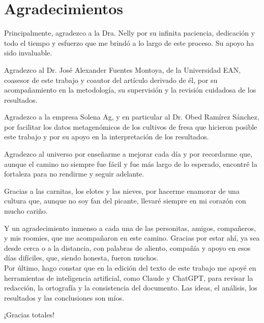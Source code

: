\documentclass[11pt]{book}
\begin{document}

\chapter*{Agradecimientos}

Principalmente, agradezco a la Dra. Nelly por su infinita paciencia, dedicación y todo el tiempo y esfuerzo que me brindó a lo largo de este proceso. Su apoyo ha sido invaluable.

Agradezco al Dr. José Alexander Fuentes Montoya, de la Universidad EAN, coasesor de este trabajo y coautor del artículo derivado de él, por su acompañamiento en la metodología, su supervisión y la revisión cuidadosa de los resultados.

Agradezco a la empresa Solena Ag, y en particular al Dr. Obed Ramírez Sánchez, por facilitar los datos metagenómicos de los cultivos de fresa que hicieron posible este trabajo y por su apoyo en la interpretación de los resultados.

Agradezco al universo por enseñarme a mejorar cada día y por recordarme que, aunque el camino no siempre fue fácil y fue más largo de lo esperado, encontré la fortaleza para no rendirme y seguir adelante.

Gracias a las carnitas, los elotes y las nieves, por hacerme enamorar de una cultura que, aunque no soy fan del picante, llevaré siempre en mi corazón con mucho cariño.

Y un agradecimiento inmenso a cada una de las personitas, amigos, compañeros, y mis roomies, que me acompañaron en este camino. Gracias por estar ahí, ya sea desde cerca o a la distancia, con palabras de aliento, compañía y apoyo en esos días difíciles, que, siendo honesta, fueron muchos.\\

Por último, hago constar que en la edición del texto de este trabajo me apoyé en herramientas de inteligencia artificial, como Claude y ChatGPT, para revisar la redacción, la ortografía y la consistencia del documento. Las ideas, el análisis, los resultados y las conclusiones son míos.

¡Gracias totales!


\end{document}
